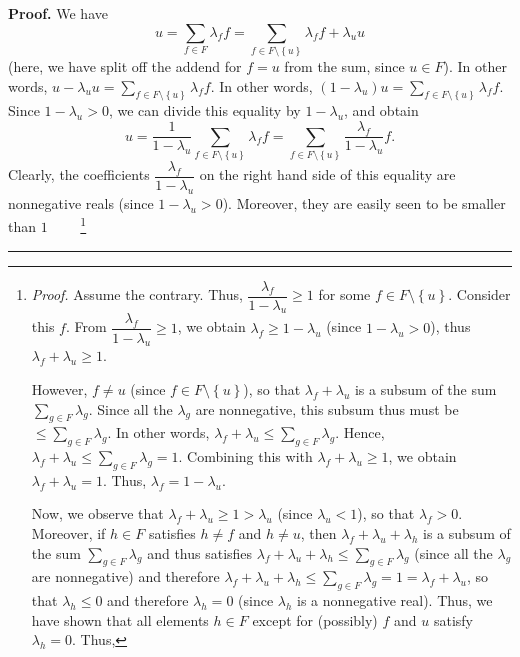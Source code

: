 \documentclass[numbers=enddot,12pt,final,onecolumn]{scrartcl}%
\theoremstyle{definition}
\newenvironment{proof}[1][Proof]{\noindent\textbf{#1.} }{\ \rule{0.5em}{0.5em}}
\let\sumnonlimits\sum
\renewcommand{\sum}{\sumnonlimits\limits}
\newenvironment{verlong}{}{}
\renewcommand{\leq}{\leqslant}
\renewcommand{\geq}{\geqslant}
\begin{document}
\begin{verlong}
\begin{proof}
We have%
\[
u=\sum_{f\in F}\lambda_{f}f=\sum_{f\in F\setminus\left\{  u\right\}  }%
\lambda_{f}f+\lambda_{u}u
\]
(here, we have split off the addend for $f=u$ from the sum, since $u\in F$).
In other words, $u-\lambda_{u}u=\sum_{f\in F\setminus\left\{  u\right\}
}\lambda_{f}f$. In other words, $\left(  1-\lambda_{u}\right)  u=\sum_{f\in
F\setminus\left\{  u\right\}  }\lambda_{f}f$. Since $1-\lambda_{u}>0$, we can
divide this equality by $1-\lambda_{u}$, and obtain%
\begin{equation}
u=\dfrac{1}{1-\lambda_{u}}\sum_{f\in F\setminus\left\{  u\right\}  }%
\lambda_{f}f=\sum_{f\in F\setminus\left\{  u\right\}  }\dfrac{\lambda_{f}%
}{1-\lambda_{u}}f. \label{pf.exa.shade.convex.s2.pf.1}%
\end{equation}
Clearly, the coefficients $\dfrac{\lambda_{f}}{1-\lambda_{u}}$ on the right
hand side of this equality are nonnegative reals (since $1-\lambda_{u}>0$).
Moreover, they are easily seen to be smaller than $1$%
\ \ \ \ \footnote{\textit{Proof.} Assume the contrary. Thus, $\dfrac
{\lambda_{f}}{1-\lambda_{u}}\geq1$ for some $f\in F\setminus\left\{
u\right\}  $. Consider this $f$. From $\dfrac{\lambda_{f}}{1-\lambda_{u}}%
\geq1$, we obtain $\lambda_{f}\geq1-\lambda_{u}$ (since $1-\lambda_{u}>0$),
thus $\lambda_{f}+\lambda_{u}\geq1$.
\par
However, $f\neq u$ (since $f\in F\setminus\left\{  u\right\}  $), so that
$\lambda_{f}+\lambda_{u}$ is a subsum of the sum $\sum_{g\in F}\lambda_{g}$.
Since all the $\lambda_{g}$ are nonnegative, this subsum thus must be
$\leq\sum_{g\in F}\lambda_{g}$. In other words, $\lambda_{f}+\lambda_{u}%
\leq\sum_{g\in F}\lambda_{g}$. Hence, $\lambda_{f}+\lambda_{u}\leq\sum_{g\in
F}\lambda_{g}=1$. Combining this with $\lambda_{f}+\lambda_{u}\geq1$, we
obtain $\lambda_{f}+\lambda_{u}=1$. Thus, $\lambda_{f}=1-\lambda_{u}$.
\par
Now, we observe that $\lambda_{f}+\lambda_{u}\geq1>\lambda_{u}$ (since
$\lambda_{u}<1$), so that $\lambda_{f}>0$. Moreover, if $h\in F$ satisfies
$h\neq f$ and $h\neq u$, then $\lambda_{f}+\lambda_{u}+\lambda_{h}$ is a
subsum of the sum $\sum_{g\in F}\lambda_{g}$ and thus satisfies $\lambda
_{f}+\lambda_{u}+\lambda_{h}\leq\sum_{g\in F}\lambda_{g}$ (since all the
$\lambda_{g}$ are nonnegative) and therefore $\lambda_{f}+\lambda_{u}%
+\lambda_{h}\leq\sum_{g\in F}\lambda_{g}=1=\lambda_{f}+\lambda_{u}$, so that
$\lambda_{h}\leq0$ and therefore $\lambda_{h}=0$ (since $\lambda_{h}$ is a
nonnegative real). Thus, we have shown that all elements $h\in F$ except for
(possibly) $f$ and $u$ satisfy $\lambda_{h}=0$. Thus,
}
\end{proof}
\end{verlong}
\end{document}
